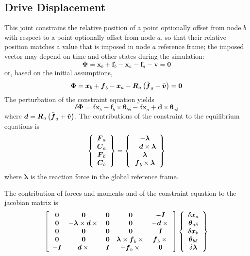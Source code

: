 \documentclass[10pt,dvips]{report}
\newcommand{\T}[1]{\boldsymbol{#1}}
\begin{document}
\subsection{Drive Displacement}
This joint constrains the relative position of a point optionally offset 
from node $b$ with respect to a point optionally offset from node $a$, 
so that their relative position matches a value that is imposed in node $a$ 
reference frame; the imposed vector may depend on time and other states
during the simulation:
\begin{equation}
	\T{\Phi} = \T{x}_b + \T{f}_b - \T{x}_a - \T{f}_a - \T{v} = \T{0}
\end{equation}
or, based on the initial assumptions,
\begin{equation}
	\T{\Phi} = \T{x}_b + \T{f}_b - \T{x}_a
		- \T{R}_a\plbr{\tilde{\T{f}}_a + \tilde{\T{v}}} = \T{0}
\end{equation}
The perturbation of the constraint equation yields
\begin{equation}
	\delta\T{\Phi} = 
		\delta\T{x}_b
		- \T{f}_b\times\T{\theta}_{b\delta}
		- \delta\T{x}_a
		+ \T{d}\times\T{\theta}_{a\delta}
\end{equation}
where $\T{d}=\T{R}_a\plbr{\tilde{\T{f}}_a + \tilde{\T{v}}}$.
The contributions of the constraint to the equilibrium equations is
\begin{equation}
	\cubr{\cvvect{
		\T{F}_a \\
		\T{C}_a \\
		\T{F}_b \\
		\T{C}_b
	}} = \cubr{\cvvect{
		- \T{\lambda} \\
		- \T{d}\times\T{\lambda} \\
		\T{\lambda} \\
		\T{f}_b\times\T{\lambda}
	}}
\end{equation}
where $\T{\lambda}$ is the reaction force in the global reference frame.

The contribution of forces and moments and of the constraint equation 
to the jacobian matrix is
\begin{equation}
	\sqbr{\matr{ccccc}{
		\T{0} & \T{0} & \T{0} & \T{0} & - \T{I} \\
		\T{0} & - \T{\lambda}\times\T{d}\times{} & \T{0} & \T{0} & - \T{d}\times{}\\
		\T{0} & \T{0} & \T{0} & \T{0} & \T{I} \\
		\T{0} & \T{0} & \T{0} & \T{\lambda}\times\T{f}_b\times{} & \T{f}_b\times{} \\
		- \T{I} & \T{d}\times{} & \T{I} & - \T{f}_b\times{} & \T{0}
	}}\cubr{\cvvect{
		\delta\T{x}_a \\
		\T{\theta}_{a\delta} \\
		\delta\T{x}_b \\
		\T{\theta}_{b\delta} \\
		\delta\T{\lambda}
	}}
\end{equation}
\end{document}
